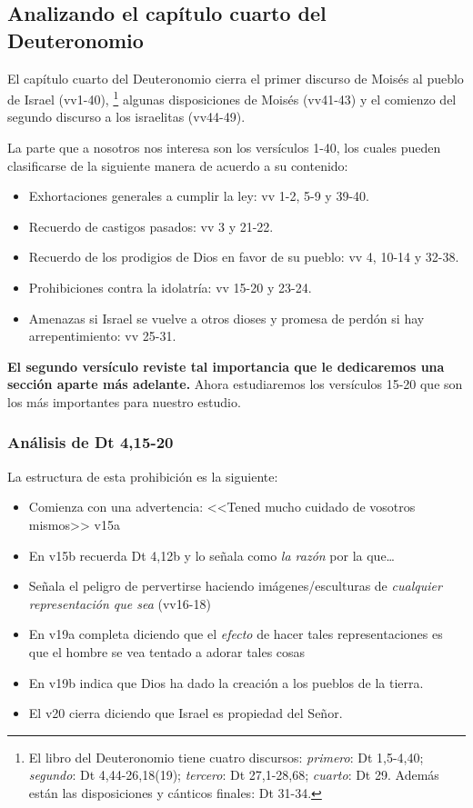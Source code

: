 \documentclass{article}
\begin{document}
\subsection{Analizando el cap\'{i}tulo cuarto del Deuteronomio}

El cap\'{i}tulo cuarto del Deuteronomio cierra el primer discurso de Mois\'es al pueblo de Israel (vv1-40),%
    \footnote{El libro del Deuteronomio tiene cuatro discursos: \emph{primero}: Dt 1,5-4,40; \emph{segundo}: Dt 4,44-26,18(19); \emph{tercero}: Dt 27,1-28,68; \emph{cuarto}: Dt 29. Adem\'as est\'an las disposiciones y c\'anticos finales: Dt 31-34.}
algunas disposiciones de Mois\'es (vv41-43) y el comienzo del segundo discurso a los israelitas (vv44-49).

La parte que a nosotros nos interesa son los vers\'{i}culos 1-40, los cuales pueden clasificarse de la siguiente manera de acuerdo a su contenido:

\begin{itemize}
\item Exhortaciones generales a cumplir la ley: vv 1-2, 5-9 y 39-40.
\item Recuerdo de castigos pasados: vv 3 y 21-22.
\item Recuerdo de los prodigios de Dios en favor de su pueblo: vv 4, 10-14 y 32-38.
\item Prohibiciones contra la idolatr\'{i}a: vv 15-20 y 23-24.
\item Amenazas si Israel se vuelve a otros dioses y promesa de perd\'on si hay arrepentimiento: vv 25-31.
\end{itemize}

\noindent
\textbf{El segundo vers\'{i}culo reviste tal importancia que le dedicaremos una secci\'on aparte m\'as adelante.} Ahora estudiaremos los vers\'iculos 15-20 que son los m\'as importantes para nuestro estudio.

\subsubsection{An\'alisis de Dt 4,15-20}

La estructura de esta prohibici\'on es la siguiente:

\begin{itemize}
\item Comienza con una advertencia: <<Tened mucho cuidado de vosotros mismos>> v15a
\item En v15b recuerda Dt 4,12b y lo se\~nala como \emph{la raz\'on} por la que\ldots
\item Se\~nala el peligro de pervertirse haciendo im\'agenes/esculturas de \emph{cualquier representaci\'on que sea} (vv16-18)
\item En v19a completa diciendo que el \emph{efecto} de hacer tales representaciones es que el hombre se vea tentado a adorar tales cosas
\item En v19b indica que Dios ha dado la creaci\'on a los pueblos de la tierra.
\item El v20 cierra diciendo que Israel es propiedad del Se\~nor.
\end{itemize}
\end{document}
